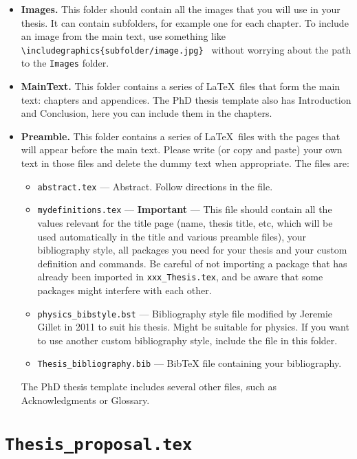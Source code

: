 \begin{itemize}

\item \textbf{Images.} This folder should contain all the images that you will use in your thesis. It can contain subfolders, for example one for each chapter. To include an image from the main text, use something like \texttt{\textbackslash includegraphics\{subfolder/image.jpg\} } without worrying about the path to the \texttt{Images} folder.

\item \textbf{MainText.} This folder contains a series of \LaTeX\ files that form the main text: chapters and appendices. The PhD thesis template also has Introduction and Conclusion, here you can include them in the chapters.

\item \textbf{Preamble.} This folder contains a series of \LaTeX\ files with the pages that will appear before the main text. Please write (or copy and paste) your own text in those files and delete the dummy text when appropriate. The files are:
\begin{itemize}
\item \texttt{abstract.tex} --- Abstract. Follow directions in the file.
\item \texttt{mydefinitions.tex} --- \textbf{Important} --- This file should contain all the values relevant for the title page (name, thesis title, etc, which will be used automatically in the title and various preamble files), your bibliography style, all packages you need for your thesis and your custom definition and commands. Be careful of not importing a package that has already been imported in \texttt{xxx\_Thesis.tex}, and be aware that some packages might interfere with each other.
\item \texttt{physics\_bibstyle.bst} --- Bibliography style file modified by Jeremie Gillet in 2011 to suit his thesis. Might be suitable for physics. If you want to use another custom bibliography style, include the file in this folder.
\item \texttt{Thesis\_bibliography.bib} --- BibTeX file containing your bibliography.
\end{itemize}

The PhD thesis template includes several other files, such as Acknowledgments or Glossary.  

\end{itemize}

\section{\texttt{Thesis\_proposal.tex}}

